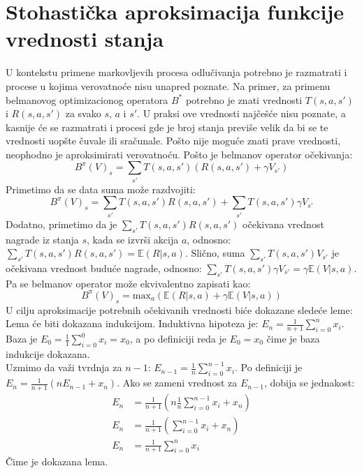 \documentclass[a4paper,fleqn,12pt]{JMThesis}
\theoremstyle{plain}
\theoremstyle{definition}
\theoremstyle{definition}
\begin{document}
\section{Stohastička aproksimacija funkcije vrednosti stanja}
U kontekstu primene markovljevih procesa odlučivanja potrebno je razmatrati i procese u kojima verovatnoće nisu unapred poznate.
Na primer, za primenu belmanovog optimizacionog operatora $B^*$ potrebno je znati vrednosti $T(s,a,s')$ i $R(s,a,s')$ za svako $s$, $a$ i $s'$.
U praksi ove vrednosti najčešće nisu poznate, a kasnije će se razmatrati i procesi gde je broj stanja previše velik da bi se te vrednosti
uopšte čuvale ili sračunale. Pošto nije moguće znati prave vrednosti, neophodno je aproksimirati verovatnoću.
Pošto je belmanov operator očekivanja:
\[ 	B^{\pi}(V)_s = \sum_{s'}T(s,a,s')(R(s,a,s') + \gamma V_{s'}) \]
Primetimo da se data suma može razdvojiti:
\[ 	B^{\pi}(V)_s = \sum_{s'}T(s,a,s')R(s,a,s') + \sum_{s'}T(s,a,s')\gamma V_{s'}\]
Dodatno, primetimo da je $\sum_{s'}T(s,a,s')R(s,a,s')$ očekivana vrednost nagrade iz stanja $s$, kada se izvrši akcija $a$, odnosno:
$\sum_{s'}T(s,a,s')R(s,a,s') = \mathbb{E}(R | s,a)$.
Slično, suma $\sum_{s'}T(s,a,s') V_{s'}$ je očekivana vrednost buduće nagrade, odnosno:
$\sum_{s'}T(s,a,s')\gamma V_{s'} = \gamma \mathbb{E}(V | s, a)$. Pa se belmanov operator može ekvivalentno zapisati kao:
\[ 	B^{\pi}(V)_s = \text{max}_{a}\left( \mathbb{E}(R | s,a) + \gamma \mathbb{E}(V | s, a) \right) \]
U cilju aproksimacije potrebnih očekivanih vrednosti biće dokazane sledeće leme:
\\
Lema će biti dokazana indukcijom. Induktivna hipoteza je: $E_n = \frac{1}{n+1}\sum_{i=0}^n x_i$.
Baza je $E_0 = \frac{1}{1}\sum_{i=0}^0 x_i = x_0$, a po definiciji reda je $E_0 = x_0$ čime je baza indukcije dokazana.\\
Uzmimo da važi tvrdnja za $n-1$: $E_{n-1} = \frac{1}{n}\sum_{i=0}^{n-1} x_i$.
Po definiciji je $E_n = \frac{1}{n+1}(n E_{n-1} + x_n)$. Ako se zameni vrednost za $E_{n-1}$, dobija se jednakost:
\[
	\begin{split}
		E_n &= \frac{1}{n+1}(n \frac{1}{n}\sum_{i=0}^{n-1}x_i + x_n)\\
		E_n &= \frac{1}{n+1}(\sum_{i=0}^{n-1}x_i + x_n)\\
		E_n &= \frac{1}{n+1}\sum_{i=0}^{n}x_i
	\end{split}
\]
Čime je dokazana lema.
\end{document}
